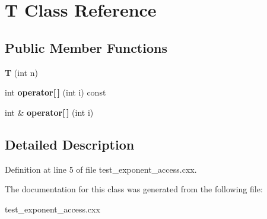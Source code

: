 \hypertarget{class_t}{}\section{T Class Reference}
\label{class_t}
\subsection*{Public Member Functions}
\begin{DoxyCompactItemize}
\item 
\hypertarget{class_t_a3240daf739e79440dbd249e0c92586fb}{}\label{class_t_a3240daf739e79440dbd249e0c92586fb} 
{\bfseries T} (int n)
\item 
\hypertarget{class_t_ac638b7bc832dc0874f1af7ec46b39348}{}\label{class_t_ac638b7bc832dc0874f1af7ec46b39348} 
int {\bfseries operator\mbox{[}$\,$\mbox{]}} (int i) const
\item 
\hypertarget{class_t_a57c4368fad12cb70d72168ec6ff61dca}{}\label{class_t_a57c4368fad12cb70d72168ec6ff61dca} 
int \& {\bfseries operator\mbox{[}$\,$\mbox{]}} (int i)
\end{DoxyCompactItemize}


\subsection{Detailed Description}


Definition at line 5 of file test\+\_\+exponent\+\_\+access.\+cxx.



The documentation for this class was generated from the following file\+:\begin{DoxyCompactItemize}
\item 
test\+\_\+exponent\+\_\+access.\+cxx\end{DoxyCompactItemize}

